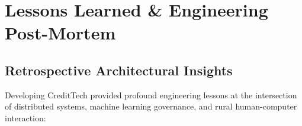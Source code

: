 \documentclass[11pt,a4paper,oneside]{report}
\begin{document}



\chapter{Lessons Learned \& Engineering Post-Mortem}
\label{chap:lessons_learned}

\section{Retrospective Architectural Insights}
Developing CreditTech provided profound engineering lessons at the intersection of distributed systems, machine learning governance, and rural human-computer interaction:
\end{document}
